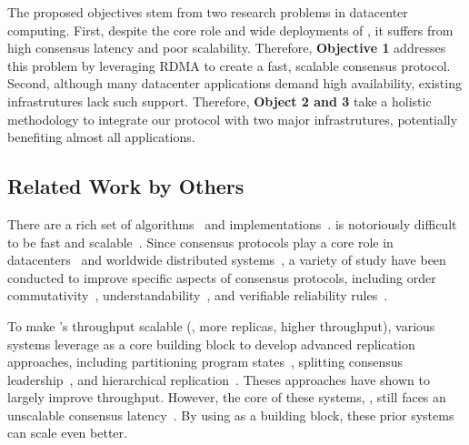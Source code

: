 The proposed objectives stem from two research problems in datacenter 
computing. First, despite the core role and wide deployments of \paxos, it 
suffers from high consensus latency and poor scalability. Therefore, 
\textbf{Objective 1} addresses this problem by leveraging RDMA to create a 
fast, scalable consensus protocol. Second, although many 
datacenter applications demand high availability, existing infrastrutures lack 
such support. Therefore, \textbf{Object 2 and 3} take a holistic methodology to 
integrate our protocol with two major infrastrutures, potentially benefiting 
almost all applications.


\vspace{-.15in}\subsection{Related Work by Others} 
\label{sec:others-work}\vspace{-.075in}

There are a rich set of \paxos 
algorithms~\cite{paxos:practical,paxos,paxos:simple,paxos:complex,
epaxos:sosp13} 
and implementations~\cite{paxos:live,paxos:practical,chubby:osdi,crane:sosp15}. 
\paxos is notoriously difficult to be fast and 
scalable~\cite{ellis:thesis,manos:hotdep10,scatter:sosp11}. Since consensus 
protocols play a core role in datacenters~\cite{matei:hotcloud11, mesos:nsdi11, 
datacenter:os} and worldwide 
distributed systems~\cite{spanner:osdi12,mencius:osdi08}, a variety of study 
have been conducted to improve specific aspects of consensus protocols, 
including order commutativity~\cite{epaxos:sosp13}, 
understandability~\cite{raft:usenix14,paxos}, and verifiable reliability 
rules~\cite{modist:nsdi09,demeter:sosp11}.

To make \paxos's throughput scalable (\ie, more replicas, higher throughput), 
various systems leverage \paxos as a core building block to develop advanced 
replication approaches, including partitioning program 
states~\cite{scatter:sosp11,ssmr:dsn14}, splitting consensus 
leadership~\cite{mencius:osdi08,spaxos:srds12}, and hierarchical 
replication~\cite{manos:hotdep10,scatter:sosp11}. Theses approaches have shown 
to largely improve throughput. However, the core of these systems, 
\paxos, still faces an unscalable consensus 
latency~\cite{ellis:thesis,scatter:sosp11,manos:hotdep10}. By using \xxx as a 
building block, these prior systems can scale even better.

